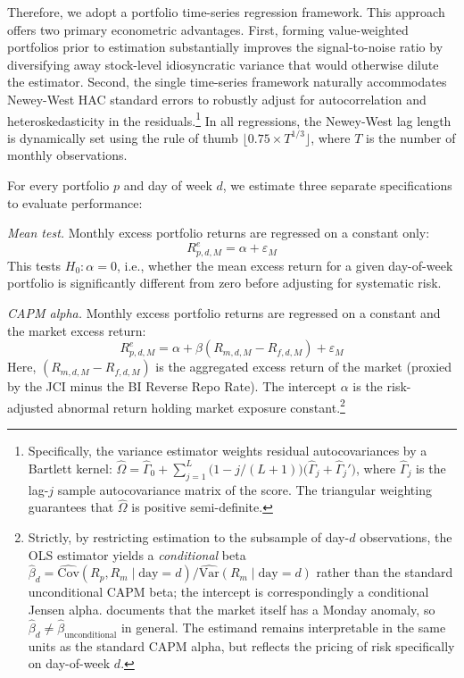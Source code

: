 \documentclass[
	a4paper,
	10pt,
	twoside,
]{LTJournalArticle}
\begin{document}
Therefore, we adopt a portfolio time-series regression framework. This approach offers two primary econometric advantages. First, forming value-weighted portfolios prior to estimation substantially improves the signal-to-noise ratio by diversifying away stock-level idiosyncratic variance that would otherwise dilute the estimator. Second, the single time-series framework naturally accommodates Newey-West HAC standard errors to robustly adjust for autocorrelation and heteroskedasticity in the residuals.\footnote{Specifically, the \citet{newey1987} variance estimator weights residual autocovariances by a Bartlett kernel: $\hat{\Omega} = \hat{\Gamma}_0 + \sum_{j=1}^{L} \big(1 - j/(L{+}1)\big)\big(\hat{\Gamma}_j + \hat{\Gamma}_j'\big)$, where $\hat{\Gamma}_j$ is the lag-$j$ sample autocovariance matrix of the score. The triangular weighting guarantees that $\hat{\Omega}$ is positive semi-definite.} In all regressions, the Newey-West lag length is dynamically set using the rule of thumb $\lfloor 0.75 \times T^{1/3} \rfloor$, where $T$ is the number of monthly observations.

For every portfolio $p$ and day of week $d$, we estimate three separate specifications to evaluate performance:

\textit{Mean test.} Monthly excess portfolio returns are regressed on a constant only:
\begin{equation}
	R^{e}_{p, d, M} = \alpha + \varepsilon_M
	\label{eq:mean}
\end{equation}
This tests $H_0\colon \alpha = 0$, i.e., whether the mean excess return for a given day-of-week portfolio is significantly different from zero before adjusting for systematic risk.

\textit{CAPM alpha.} Monthly excess portfolio returns are regressed on a constant and the market excess return:
\begin{equation}
	R^{e}_{p, d, M} = \alpha + \beta (R_{m, d, M} - R_{f, d, M}) + \varepsilon_M
	\label{eq:capm}
\end{equation}
Here, $(R_{m, d, M} - R_{f, d, M})$ is the aggregated excess return of the market (proxied by the JCI minus the BI Reverse Repo Rate). The intercept $\alpha$ is the risk-adjusted abnormal return holding market exposure constant.\footnote{Strictly, by restricting estimation to the subsample of day-$d$ observations, the OLS estimator yields a \textit{conditional} beta $\hat{\beta}_d = \widehat{\text{Cov}}(R_p, R_m \mid \text{day} = d) / \widehat{\text{Var}}(R_m \mid \text{day} = d)$ rather than the standard unconditional CAPM beta; the intercept is correspondingly a conditional Jensen alpha. \citet{french1980} documents that the market itself has a Monday anomaly, so $\hat{\beta}_d \neq \hat{\beta}_{\text{unconditional}}$ in general. The estimand remains interpretable in the same units as the standard CAPM alpha, but reflects the pricing of risk specifically on day-of-week $d$.}
\end{document}
